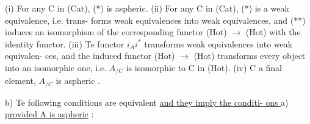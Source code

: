 (i)  For any C in (Cat),  (*) is aspheric.
(ii)  For any C in (Cat),  (*) is a weak equivalence,  i.e. \unsure{(\deleted{**})} trans-%
forms weak equivalences  into weak equivalences,  and (**) induces
an isomorphism of the corresponding functor (Hot) $\to$ (Hot) with the
identity functor.
(iii)  Te functor $i_{A}i^{*}$  transforms weak equivalences into weak equivalen-%
ces,  and the induced functor (Hot) $\to$ (Hot) transforms every object
into an isomorphic one,  i.e.  $A_{/C}$ is isomorphic to C in (Hot).
(iv)    C  a final element,  $A_{/C}$ is aspheric .

b)  Te following conditions are equivalent\over{\unsure{:}}{,} \uline{and they imply the conditi-%
ons } a)  \uline{provided A is aspheric} :
